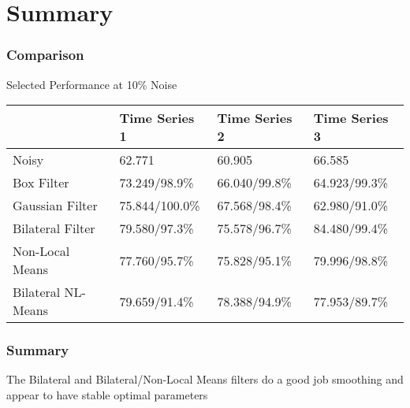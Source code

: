 \documentclass{beamer}
\begin{document}
\section{Summary}

\begin{frame}
\begin{center}
\frametitle{Comparison}

\small{

Selected Performance at 10\% Noise

\begin{table}[h]
\begin{tabular}{l | l | l | l}
 & Time Series 1 & Time Series 2 & Time Series 3 \\ \hline
Noisy &62.771 &60.905 & 66.585 \\ \hline
Box Filter &73.249/98.9\% &66.040/99.8\% & 64.923/99.3\% \\ \hline
Gaussian Filter & 75.844/100.0\% & 67.568/98.4\% & 62.980/91.0\% \\ \hline
\cellcolor{airforceblue}Bilateral Filter & \cellcolor{aliceblue}79.580/97.3\% & 75.578/96.7\% & \cellcolor{aliceblue}84.480/99.4\% \\ \hline
Non-Local Means & 77.760/95.7\% & 75.828/95.1\% & 79.996/98.8\% \\ \hline
\cellcolor{airforceblue}Bilateral NL-Means & \cellcolor{aliceblue}79.659/91.4\% & \cellcolor{aliceblue}78.388/94.9\% & 77.953/89.7\%
\end{tabular}
\end{table}

}

\end{center}
\end{frame}


\begin{frame}
\begin{center}
\frametitle{Summary}

The Bilateral and Bilateral/Non-Local Means filters do a good job smoothing and appear to have stable optimal parameters

\end{center}
\end{frame}

\end{document}
